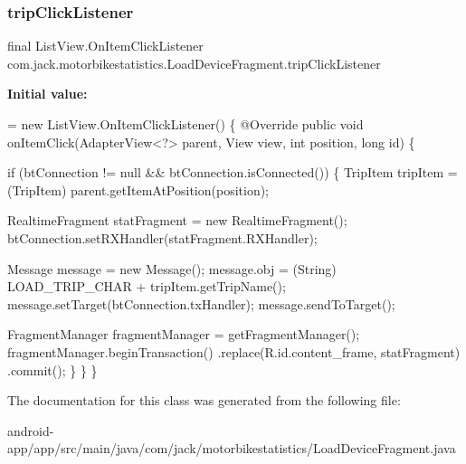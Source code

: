 \subsubsection{\texorpdfstring{trip\+Click\+Listener}{tripClickListener}}
{\footnotesize\ttfamily final List\+View.\+On\+Item\+Click\+Listener com.\+jack.\+motorbikestatistics.\+Load\+Device\+Fragment.\+trip\+Click\+Listener}

{\bfseries Initial value\+:}
\begin{DoxyCode}
= \textcolor{keyword}{new} ListView.OnItemClickListener() \{
        @Override
        \textcolor{keyword}{public} \textcolor{keywordtype}{void} onItemClick(AdapterView<?> parent, View view, \textcolor{keywordtype}{int} position, \textcolor{keywordtype}{long} \textcolor{keywordtype}{id}) \{

            \textcolor{keywordflow}{if} (btConnection != null && btConnection.isConnected()) \{
                TripItem tripItem = (TripItem) parent.getItemAtPosition(position);

                
                RealtimeFragment statFragment = \textcolor{keyword}{new} RealtimeFragment();
                btConnection.setRXHandler(statFragment.RXHandler);

                
                Message message = \textcolor{keyword}{new} Message();
                message.obj = (String) LOAD\_TRIP\_CHAR + tripItem.getTripName();
                message.setTarget(btConnection.txHandler);
                message.sendToTarget();

                FragmentManager fragmentManager = getFragmentManager();
                fragmentManager.beginTransaction()
                        .replace(R.id.content\_frame, statFragment)
                        .commit();
            \}
        \}
    \}
\end{DoxyCode}


The documentation for this class was generated from the following file\+:\begin{DoxyCompactItemize}
\item 
android-\/app/app/src/main/java/com/jack/motorbikestatistics/Load\+Device\+Fragment.\+java\end{DoxyCompactItemize}
